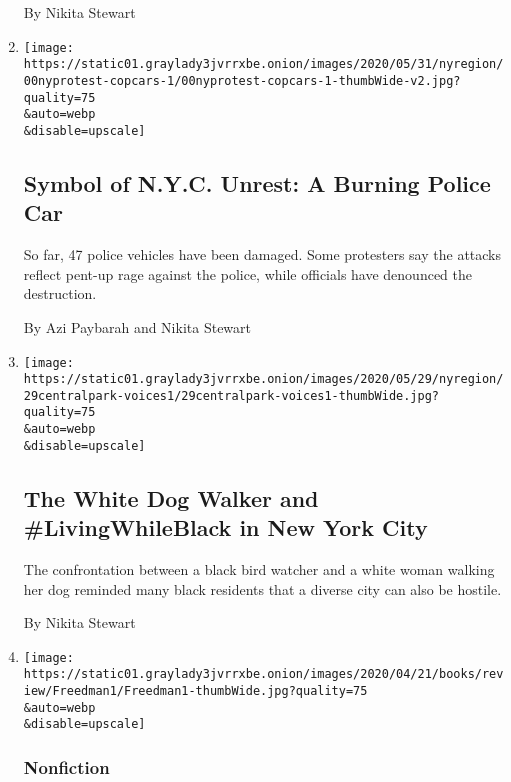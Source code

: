 \begin{enumerate}
  By Nikita Stewart
\item
  \href{/2020/05/31/nyregion/police-cars-nyc-protests.html}{}

  \texttt{[image: https://static01.graylady3jvrrxbe.onion/images/2020/05/31/nyregion/00nyprotest-copcars-1/00nyprotest-copcars-1-thumbWide-v2.jpg?quality=75\\\&auto=webp\\\&disable=upscale]}

  \hypertarget{symbol-of-nyc-unrest-a-burning-police-car}{%
  \subsection{Symbol of N.Y.C. Unrest: A Burning Police
  Car}\label{symbol-of-nyc-unrest-a-burning-police-car}}

  So far, 47 police vehicles have been damaged. Some protesters say the
  attacks reflect pent-up rage against the police, while officials have
  denounced the destruction.

  By Azi Paybarah and Nikita Stewart
\item
  \href{/2020/05/30/nyregion/central-park-video.html}{}

  \texttt{[image: https://static01.graylady3jvrrxbe.onion/images/2020/05/29/nyregion/29centralpark-voices1/29centralpark-voices1-thumbWide.jpg?quality=75\\\&auto=webp\\\&disable=upscale]}

  \hypertarget{the-white-dog-walker-and-livingwhileblack-in-new-york-city}{%
  \subsection{The White Dog Walker and \#LivingWhileBlack in New York
  City}\label{the-white-dog-walker-and-livingwhileblack-in-new-york-city}}

  The confrontation between a black bird watcher and a white woman
  walking her dog reminded many black residents that a diverse city can
  also be hostile.

  By Nikita Stewart
\item
  \href{/2020/05/19/books/review/troop-6000-nikita-stewart.html}{}

  \texttt{[image: https://static01.graylady3jvrrxbe.onion/images/2020/04/21/books/review/Freedman1/Freedman1-thumbWide.jpg?quality=75\\\&auto=webp\\\&disable=upscale]}

  \hypertarget{nonfiction}{%
  \subsubsection{Nonfiction}\label{nonfiction}}


\end{enumerate}
